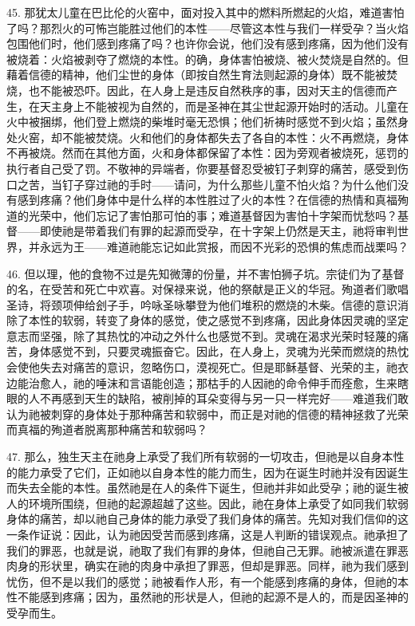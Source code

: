 45. 那犹太儿童在巴比伦的火窑中，面对投入其中的燃料所燃起的火焰，难道害怕了吗？那烈火的可怖岂能胜过他们的本性——尽管这本性与我们一样受孕？当火焰包围他们时，他们感到疼痛了吗？也许你会说，他们没有感到疼痛，因为他们没有被烧着：火焰被剥夺了燃烧的本性。的确，身体害怕被烧、被火焚烧是自然的。但藉着信德的精神，他们尘世的身体（即按自然生育法则起源的身体）既不能被焚烧，也不能被恐吓。因此，在人身上是违反自然秩序的事，因对天主的信德而产生，在天主身上不能被视为自然的，而是圣神在其尘世起源开始时的活动。儿童在火中被捆绑，他们登上燃烧的柴堆时毫无恐惧；他们祈祷时感觉不到火焰；虽然身处火窑，却不能被焚烧。火和他们的身体都失去了各自的本性：火不再燃烧，身体不再被烧。然而在其他方面，火和身体都保留了本性：因为旁观者被烧死，惩罚的执行者自己受了罚。不敬神的异端者，你要基督忍受被钉子刺穿的痛苦，感受到伤口之苦，当钉子穿过祂的手时——请问，为什么那些儿童不怕火焰？为什么他们没有感到疼痛？他们身体中是什么样的本性胜过了火的本性？在信德的热情和真福殉道的光荣中，他们忘记了害怕那可怕的事；难道基督因为害怕十字架而忧愁吗？基督——即使祂是带着我们有罪的起源而受孕，在十字架上仍然是天主，祂将审判世界，并永远为王——难道祂能忘记如此赏报，而因不光彩的恐惧的焦虑而战栗吗？\par

46. 但以理，他的食物不过是先知微薄的份量，并不害怕狮子坑。宗徒们为了基督的名，在受苦和死亡中欢喜。对保禄来说，他的祭献是正义的华冠。殉道者们歌唱圣诗，将颈项伸给刽子手，吟咏圣咏攀登为他们堆积的燃烧的木柴。信德的意识消除了本性的软弱，转变了身体的感觉，使之感觉不到疼痛，因此身体因灵魂的坚定意志而坚强，除了其热忱的冲动之外什么也感觉不到。灵魂在渴求光荣时轻蔑的痛苦，身体感觉不到，只要灵魂振奋它。因此，在人身上，灵魂为光荣而燃烧的热忱会使他失去对痛苦的意识，忽略伤口，漠视死亡。但是耶稣基督、光荣的主，祂衣边能治愈人，祂的唾沫和言语能创造；那枯手的人因祂的命令伸手而痊愈，生来瞎眼的人不再感到天生的缺陷，被削掉的耳朵变得与另一只一样完好——难道我们敢认为祂被刺穿的身体处于那种痛苦和软弱中，而正是对祂的信德的精神拯救了光荣而真福的殉道者脱离那种痛苦和软弱吗？\par

47. 那么，独生天主在祂身上承受了我们所有软弱的一切攻击，但祂是以自身本性的能力承受了它们，正如祂以自身本性的能力而生，因为在诞生时祂并没有因诞生而失去全能的本性。虽然祂是在人的条件下诞生，但祂并非如此受孕；祂的诞生被人的环境所围绕，但祂的起源超越了这些。因此，祂在身体上承受了如同我们软弱身体的痛苦，却以祂自己身体的能力承受了我们身体的痛苦。先知对我们信仰的这一条作证说：因此，认为祂因受苦而感到疼痛，这是人判断的错误观点。祂承担了我们的罪恶，也就是说，祂取了我们有罪的身体，但祂自己无罪。祂被派遣在罪恶肉身的形状里，确实在祂的肉身中承担了罪恶，但却是罪恶。同样，祂为我们感到忧伤，但不是以我们的感觉；祂被看作人形，有一个能感到疼痛的身体，但祂的本性不能感到疼痛；因为，虽然祂的形状是人，但祂的起源不是人的，而是因圣神的受孕而生。\par

